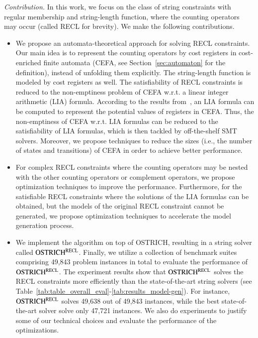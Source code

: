 \medskip
\noindent 
\emph{Contribution.} In this work, we focus on the class of string constraints with regular membership and string-length function, where the counting operators may occur (called RECL for brevity). We make the following contributions.
\begin{itemize}
  \item We propose an automata-theoretical approach for solving RECL constraints.
 Our main idea is to represent the counting operators by cost registers in cost-enriched finite automata (CEFA, see Section~\ref{sec:automaton} for the definition), instead of unfolding them explicitly. The string-length function is modeled by cost registers as well. The satisfiability of RECL constraints is reduced to the non-emptiness problem of CEFA w.r.t. a linear integer arithmetic (LIA) formula. According to the results from~\cite{atva2020}, an LIA formula can be computed to represent the potential values of registers in CEFA.
Thus, the non-emptiness of CEFA w.r.t. LIA formulas can be reduced to the satisfiability of LIA formulas, which is then tackled by off-the-shelf SMT solvers. Moreover, we propose techniques to reduce the sizes (i.e., the number of states and transitions) of CEFA in order to achieve better performance.
%
  \item For complex RECL constraints where the counting operators may be nested with the other counting operators or complement operators, we propose optimization techniques to improve the performance. Furthermore, for the satisfiable RECL constraints where the solutions of the LIA formulas can be obtained, but the models of the original RECL constraint cannot be generated,  we propose optimization techniques to accelerate the model generation process. 
%
\item We implement the algorithm on top of OSTRICH, resulting in a string solver called $\rm OSTRICH^{RECL}$. Finally, we utilize a collection of benchmark suites comprising 49,843 problem instances in total to evaluate the performance of $\rm OSTRICH^{RECL}$. The experiment results show that $\rm OSTRICH^{RECL}$ solves the RECL constraints more efficiently than the state-of-the-art string solvers (see Table~\ref{tab:table_overall_eval}-\ref{tab:results_model-gen}). For instance, $\rm OSTRICH^{RECL}$ solves 49,638 out of 49,843 instances, while the best state-of-the-art solver solve only 47,721 instances. We also do experiments to justify some of our technical choices and evaluate the performance of the optimizations. 
%
\end{itemize}

